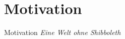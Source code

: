 
{
    \section{Motivation}
}

\begin{frame}{Motivation}
    \emph{Eine Welt ohne Shibboleth}
\end{frame}
